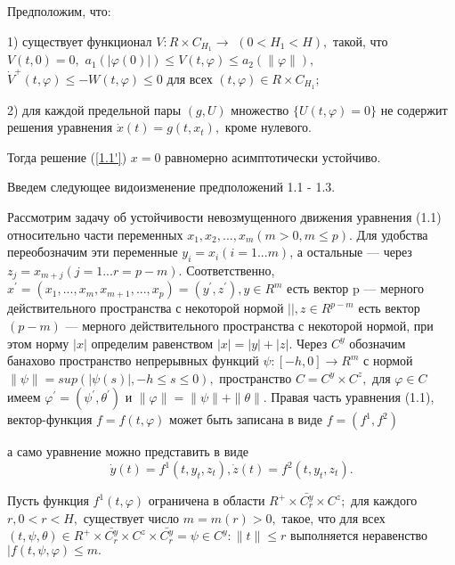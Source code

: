 	\begin{theorem}\label{t-4.5} Предположим, что:
		
		1) существует функционал $V: R \times C_{H_1}\to $ $(0<H_1<H),$
		такой,  что $V(t,0)=0,$ $a_1(|\varphi (0)|)\le V(t,\varphi )\le a_2(\|\varphi \| ),$
		$\dot V^+(t,\varphi )\le -W(t,\varphi )\le 0$ для всех
		$(t,\varphi )\in R \times C_{H_1};$
		
		2) для  каждой  предельной пары $(g,U)$  множество $\{ U(t,\varphi )=0\}$  не
		содержит решения уравнения $\dot x(t)=g(t,x_t),$  кроме нулевого.
		
		
		Тогда решение (\ref{1.1'})  $x=0$ равномерно асимптотически устойчиво.
	\end{theorem}
	
	Введем следующее видоизменение предположений 1.1 - 1.3.
	
	Рассмотрим задачу об устойчивости невозмущенного движения уравнения (1.1) относительно части переменных $x_1, x_2, ... , x_m (m > 0, m \le p).$ Для удобства переобозначим эти переменные $y_i = x_i (i = 1...m)$, а остальные --- через $z_j = x_{m+j} (j = 1...r = p - m).$ Соответственно, $x^{'} = (x_1, ... , x_m, x_{m+1}, ..., x_p) = (y^{'}, z^{'}), y \in R^m$ есть вектор p --- мерного действительного пространства с некоторой нормой $||, z \in R^{p-m}$ есть вектор $(p-m)$ --- мерного действительного пространства с некоторой нормой, при этом норму $|x|$ определим равенством $|x| = |y| + |z|.$ Через $C^y$ обозначим банахово пространство непрерывных функций $\psi : [-h, 0] \to R^m$ с нормой $\| \psi \| = sup(| \psi(s) |, -h \le s \le 0),$ пространство $C = C^y \times C^z,$ для $\varphi \in C$ имеем $\varphi^{'} = (\psi^{'}, \theta^{'})$ и $\| \varphi \| = \| \psi \| + \| \theta \|.$ Правая часть уравнения (1.1), вектор-функция $f = f(t, \varphi)$ может быть записана в виде $f = (f^1, f^2)$
	
	а само уравнение можно представить в виде 
	\begin{equation}
	\dot y(t) = f^1(t, y_t, z_t), \dot z(t) = f^2(t, y_t, z_t).
	\end{equation}
	
	\begin{definition}\label{AS1} Пусть функция $f^1(t, \varphi)$ ограничена в области $R^+ \times \bar{C_r^y} \times C^z; $ для каждого $r, 0 < r < H,$ существует число $m = m(r) > 0,$ такое, что для всех $(t, \psi, \theta) \in R^+ \times \bar{C_r^y} \times C^z \times \bar{C_r^y} = {\psi \in C^y : \| t \| \le r}$ выполняется неравенство $| f(t, \psi, \varphi) \le m .$
	\end{definition}
	
